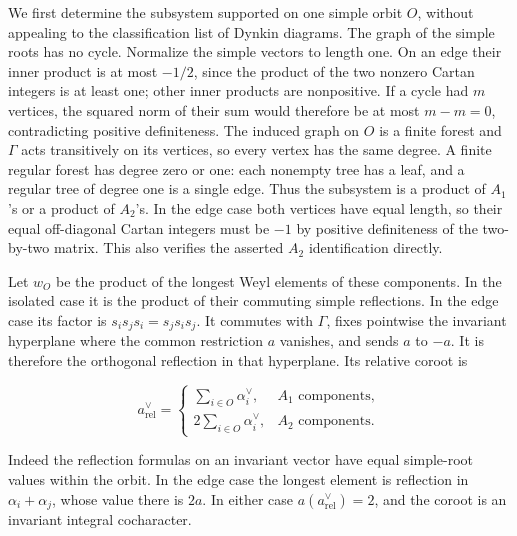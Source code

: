 \documentclass[
  11pt,
]{article}
\begin{document}
We first determine the subsystem supported on one simple orbit \(O\),
without appealing to the classification list of Dynkin diagrams. The
graph of the simple roots has no cycle. Normalize the simple vectors to
length one. On an edge their inner product is at most \(-1/2\), since
the product of the two nonzero Cartan integers is at least one; other
inner products are nonpositive. If a cycle had \(m\) vertices, the
squared norm of their sum would therefore be at most \(m-m=0\),
contradicting positive definiteness. The induced graph on \(O\) is a
finite forest and \(\Gamma\) acts transitively on its vertices, so every
vertex has the same degree. A finite regular forest has degree zero or
one: each nonempty tree has a leaf, and a regular tree of degree one is
a single edge. Thus the subsystem is a product of \(A_1\)'s or a product
of \(A_2\)'s. In the edge case both vertices have equal length, so their
equal off-diagonal Cartan integers must be \(-1\) by positive
definiteness of the two-by-two matrix. This also verifies the asserted
\(A_2\) identification directly.

Let \(w_O\) be the product of the longest Weyl elements of these
components. In the isolated case it is the product of their commuting
simple reflections. In the edge case its factor is
\(s_i s_j s_i=s_j s_i s_j\). It commutes with \(\Gamma\), fixes
pointwise the invariant hyperplane where the common restriction \(a\)
vanishes, and sends \(a\) to \(-a\). It is therefore the orthogonal
reflection in that hyperplane. Its relative coroot is

\[
 a^\vee_{\mathrm{rel}}=
 \begin{cases}
 \sum_{i\in O}\alpha_i^\vee,&A_1\text{ components},\\
 2\sum_{i\in O}\alpha_i^\vee,&A_2\text{ components}.
 \end{cases}
 \tag{GB.12}
\]

Indeed the reflection formulas on an invariant vector have equal
simple-root values within the orbit. In the edge case the longest
element is reflection in \(\alpha_i+\alpha_j\), whose value there is
\(2a\). In either case \(a(a^\vee_{\mathrm{rel}})=2\), and the coroot is
an invariant integral cocharacter.
\end{document}

